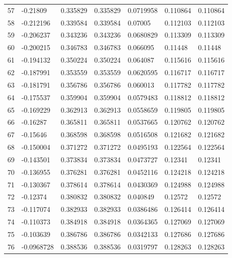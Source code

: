 \begin{longtable}{l|lll|lll}
  57 & -0.21809     & 0.335829    & 0.335829    &  0.0719958   & 0.110864    & 0.110864    \\
  58 & -0.212196    & 0.339584    & 0.339584    &  0.07005     & 0.112103    & 0.112103    \\
  59 & -0.206237    & 0.343236    & 0.343236    &  0.0680829   & 0.113309    & 0.113309    \\
  60 & -0.200215    & 0.346783    & 0.346783    &  0.066095    & 0.11448     & 0.11448     \\
  61 & -0.194132    & 0.350224    & 0.350224    &  0.064087    & 0.115616    & 0.115616    \\
  62 & -0.187991    & 0.353559    & 0.353559    &  0.0620595   & 0.116717    & 0.116717    \\
  63 & -0.181791    & 0.356786    & 0.356786    &  0.060013    & 0.117782    & 0.117782    \\
  64 & -0.175537    & 0.359904    & 0.359904    &  0.0579483   & 0.118812    & 0.118812    \\
  65 & -0.169229    & 0.362913    & 0.362913    &  0.0558659   & 0.119805    & 0.119805    \\
  66 & -0.16287     & 0.365811    & 0.365811    &  0.0537665   & 0.120762    & 0.120762    \\
  67 & -0.15646     & 0.368598    & 0.368598    &  0.0516508   & 0.121682    & 0.121682    \\
  68 & -0.150004    & 0.371272    & 0.371272    &  0.0495193   & 0.122564    & 0.122564    \\
  69 & -0.143501    & 0.373834    & 0.373834    &  0.0473727   & 0.12341     & 0.12341     \\
  70 & -0.136955    & 0.376281    & 0.376281    &  0.0452116   & 0.124218    & 0.124218    \\
  71 & -0.130367    & 0.378614    & 0.378614    &  0.0430369   & 0.124988    & 0.124988    \\
  72 & -0.12374     & 0.380832    & 0.380832    &  0.040849    & 0.12572     & 0.12572     \\
  73 & -0.117074    & 0.382933    & 0.382933    &  0.0386486   & 0.126414    & 0.126414    \\
  74 & -0.110373    & 0.384918    & 0.384918    &  0.0364365   & 0.127069    & 0.127069    \\
  75 & -0.103639    & 0.386786    & 0.386786    &  0.0342133   & 0.127686    & 0.127686    \\
  76 & -0.0968728   & 0.388536    & 0.388536    &  0.0319797   & 0.128263    & 0.128263    \\

\end{longtable}
